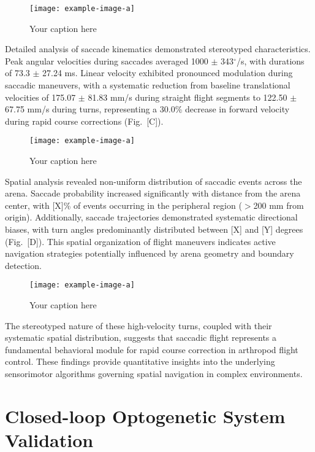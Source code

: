\documentclass[../main/thesis_msc.tex]{subfiles}
\begin{document}
\begin{figure}[htbp]
    \centering
    \texttt{[image: example-image-a]}
    \caption{Your caption here}
    \label{fig:your-label}
\end{figure}
Detailed analysis of saccade kinematics demonstrated stereotyped characteristics. Peak angular velocities during saccades averaged 1000 $\pm$ 343$^{\circ}$/s, with durations of 73.3 $\pm$ 27.24 ms. Linear velocity exhibited pronounced modulation during saccadic maneuvers, with a systematic reduction from baseline translational velocities of 175.07 $\pm$ 81.83 mm/s during straight flight segments to 122.50 $\pm$ 67.75 mm/s during turns, representing a 30.0\% decrease in forward velocity during rapid course corrections (Fig.~[C]).

\begin{figure}[htbp]
    \centering
    \texttt{[image: example-image-a]}
    \caption{Your caption here}
    \label{fig:your-label}
\end{figure}

Spatial analysis revealed non-uniform distribution of saccadic events across the arena. Saccade probability increased significantly with distance from the arena center, with [X]\% of events occurring in the peripheral region ($>$200 mm from origin). Additionally, saccade trajectories demonstrated systematic directional biases, with turn angles predominantly distributed between [X] and [Y] degrees (Fig.~[D]). This spatial organization of flight maneuvers indicates active navigation strategies potentially influenced by arena geometry and boundary detection.

\begin{figure}[htbp]
    \centering
    \texttt{[image: example-image-a]}
    \caption{Your caption here}
    \label{fig:your-label}
\end{figure}

The stereotyped nature of these high-velocity turns, coupled with their systematic spatial distribution, suggests that saccadic flight represents a fundamental behavioral module for rapid course correction in arthropod flight control. These findings provide quantitative insights into the underlying sensorimotor algorithms governing spatial navigation in complex environments.

\section{Closed-loop Optogenetic System Validation}
\end{document}
